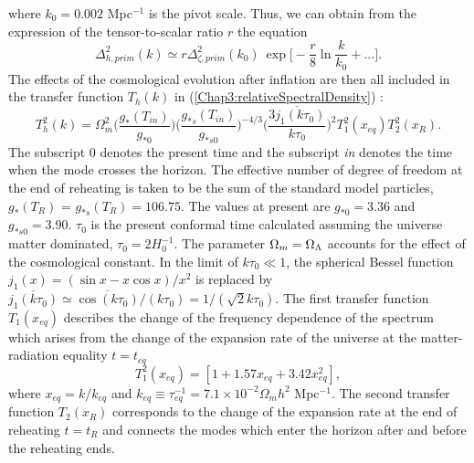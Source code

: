 \documentclass[11pt,a4paper,twoside]{book}
\begin{document}
where $ k_{0} = 0.002 $ Mpc$^{-1}$ is the pivot scale. Thus, we can obtain from the expression of the tensor-to-scalar ratio $ r $ the equation \cite{Chap3:ProspectsForDeterminationWithDetectors}
\begin{equation}
	\label{Chapter3:solutionSpectrumDelta}
	\Delta^{2}_{h,prim}(k) \simeq r\Delta_{\zeta,prim}^{2}(k_{0})\ \exp \Bigg[-\frac{r}{8}\ln \frac{k}{k_{0}} + ... \Bigg].
\end{equation}
The effects of the cosmological evolution after inflation are then all included in the transfer function $ T_{h}(k) $ in (\ref{Chap3:relativeSpectralDensity}) \cite{Chap3:ProspectsForDeterminationWithDetectors}:
\begin{equation}
	\label{Chap3:FinalTransferFunction}
	T^{2}_{h}(k) = \Omega_{m}^{2}\Bigg (\frac{g_{*}(T_{in})}{g_{*0}}\Bigg)\Bigg (\frac{g_{*s}(T_{in})}{g_{*s0}}\Bigg)^{-4/3} \Bigg ( \overline{\frac{3j_{1}(k\tau_{0})}{k\tau_{0}}}\Bigg)^{2} T_{1}^{2}(x_{eq})T^{2}_{2}(x_{R}).
\end{equation}
The subscript 0 denotes the present time and the subscript \textit{in} denotes the time when the mode crosses the horizon. The effective number of degree of freedom at the end of reheating is taken to be the sum of the standard model particles,  $ g_{*}(T_{R}) $ =  $ g_{*s}(T_{R}) = 106.75 $. The values at present are $ g_{*0}=3.36 $ and $ g_{*s0}=3.90 $. $\tau_{0}$ is the present conformal time calculated assuming the universe matter dominated, $ \tau_{0}=2H_{0}^{-1} $. The parameter $\Omega_{m}=\-\Omega_{\Lambda}  $ accounts for the effect of the cosmological constant. In the limit of $ k\tau_{0} \ll 1 $, the spherical Bessel function $ j_{1}(x)=(\sin x -  x\cos x)/x^{2} $ is replaced by $ \overline{j_{1}(k\tau_{0})} \simeq \overline{\cos (k\tau_{0})}/(k\tau_{0}) = 1/(\sqrt{2}k\tau_{0}) $. The first transfer function $ T_{1}(x_{eq}) $  describes the change of the frequency dependence of the spectrum which arises from the change of the expansion rate of the universe at the matter-radiation equality $ t=t_{eq} $
\begin{equation}
	\label{TransferFunction}
	T_{1}^{2}(x_{eq})=[1+1.57 x_{eq} + 3.42 x_{eq}^{2} ],
\end{equation}
where $ x_{eq} = k/k_{eq} $ and $ k_{eq} \equiv \tau_{eq}^{-1} = 7.1 \times 10^{-2} \Omega_{m} h^{2} $ Mpc$^{-1}$. The second transfer function $ T_{2}(x_{R}) $ corresponds to the change of the expansion rate at the end of reheating $ t=t_{R} $ and connects the modes which enter the horizon after and before the reheating ends. \\
\end{document}

